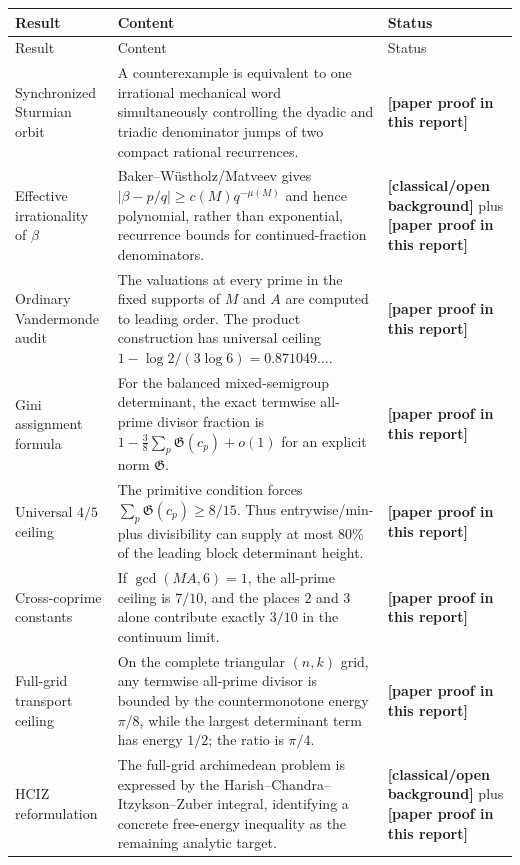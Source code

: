 \documentclass[11pt,oneside]{article}
\theoremstyle{definition}
\theoremstyle{remark}
\newcommand{\statusnew}{\textcolor{newgreen}{\textbf{[paper proof in this report]}}}
\newcommand{\statusknown}{\textcolor{classicalgray}{\textbf{[classical/\allowbreak open background]}}}
\begin{document}
\begin{longtable}{@{}>{\raggedright\arraybackslash}p{}>{\raggedright\arraybackslash}p{}>{\raggedright\arraybackslash}p{}@{}}
\toprule
Result & Content & Status\\
\midrule
\endfirsthead
\toprule
Result & Content & Status\\
\midrule
\endhead
Synchronized Sturmian orbit & A counterexample is equivalent to one irrational mechanical word simultaneously controlling the dyadic and triadic denominator jumps of two compact rational recurrences. & \statusnew\\
\addlinespace
Effective irrationality of $\beta$ & Baker--W\"ustholz/Matveev gives $|\beta-p/q|\ge c(M)q^{-\mu(M)}$ and hence polynomial, rather than exponential, recurrence bounds for continued-fraction denominators. & \statusknown{} plus \statusnew\\
\addlinespace
Ordinary Vandermonde audit & The valuations at every prime in the fixed supports of $M$ and $A$ are computed to leading order.  The product construction has universal ceiling $1-\log2/(3\log6)=0.871049\ldots$. & \statusnew\\
\addlinespace
Gini assignment formula & For the balanced mixed-semigroup determinant, the exact termwise all-prime divisor fraction is $1-\frac38\sum_p\mathfrak G(c_p)+o(1)$ for an explicit norm $\mathfrak G$. & \statusnew\\
\addlinespace
Universal $4/5$ ceiling & The primitive condition forces $\sum_p\mathfrak G(c_p)\ge8/15$.  Thus entrywise/min-plus divisibility can supply at most $80\%$ of the leading block determinant height. & \statusnew\\
\addlinespace
Cross-coprime constants & If $\gcd(MA,6)=1$, the all-prime ceiling is $7/10$, and the places $2$ and $3$ alone contribute exactly $3/10$ in the continuum limit. & \statusnew\\
\addlinespace
Full-grid transport ceiling & On the complete triangular $(n,k)$ grid, any termwise all-prime divisor is bounded by the countermonotone energy $\pi/8$, while the largest determinant term has energy $1/2$; the ratio is $\pi/4$. & \statusnew\\
\addlinespace
HCIZ reformulation & The full-grid archimedean problem is expressed by the Harish--Chandra--Itzykson--Zuber integral, identifying a concrete free-energy inequality as the remaining analytic target. & \statusknown{} plus \statusnew\\
\bottomrule
\end{longtable}
\end{document}
